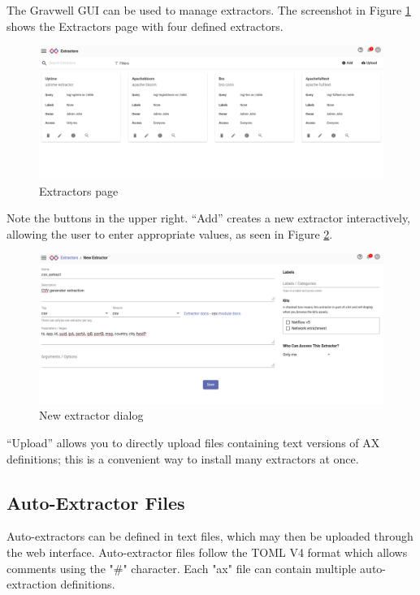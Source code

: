 The Gravwell GUI can be used to manage extractors. The screenshot in Figure \ref{fig:extractors-page}
shows the Extractors page with four defined extractors.

\begin{figure}
	\includegraphics{images/extractors-page.png}
	\caption{Extractors page}
	\label{fig:extractors-page}
\end{figure}

Note the buttons in the upper right. ``Add'' creates a new extractor
interactively, allowing the user to enter appropriate values, as seen in Figure \ref{fig:new-extractor}.

\begin{figure}
	\includegraphics{images/new-extractor.png}
	\caption{New extractor dialog}
	\label{fig:new-extractor}
\end{figure}

``Upload'' allows you to directly upload files containing text versions of AX definitions; this is a convenient way to install many extractors at once.

\subsection{Auto-Extractor Files}

Auto-extractors can be defined in text files, which may then be uploaded through
the web interface. Auto-extractor files follow the TOML V4 format which allows comments
using the "\#" character. Each "ax" file can contain multiple
auto-extraction definitions.

